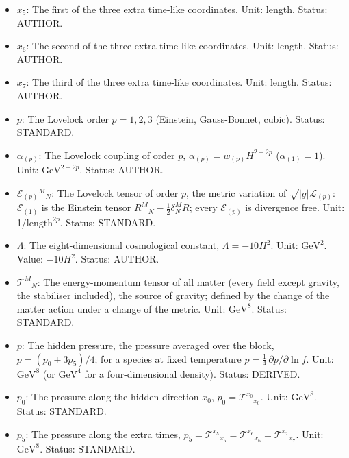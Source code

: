\documentclass[
  10pt,
]{article}
\begin{document}
\begin{itemize}
  depends on it through \(z = 6Hx_0\), periodically with the period
  \(\pi/(6H)\). Unit: length. Status: AUTHOR.
\item
  \(x_5\): The first of the three extra time-like coordinates. Unit:
  length. Status: AUTHOR.
\item
  \(x_6\): The second of the three extra time-like coordinates. Unit:
  length. Status: AUTHOR.
\item
  \(x_7\): The third of the three extra time-like coordinates. Unit:
  length. Status: AUTHOR.
\item
  \(p\): The Lovelock order \(p = 1, 2, 3\) (Einstein, Gauss-Bonnet,
  cubic). Status: STANDARD.
\item
  \(\alpha_{(p)}\): The Lovelock coupling of order \(p\),
  \(\alpha_{(p)} = w_{(p)}H^{2-2p}\) (\(\alpha_{(1)} = 1\)). Unit:
  \(\mathrm{GeV}^{2-2p}\). Status: AUTHOR.
\item
  \(\mathcal{E}_{(p)}{}^M{}_N\): The Lovelock tensor of order \(p\), the
  metric variation of \(\sqrt{\lvert g\rvert}\mathcal{L}_{(p)}\):
  \(\mathcal{E}_{(1)}\) is the Einstein tensor
  \(R^M{}_N - \frac12\delta^M_NR\); every \(\mathcal{E}_{(p)}\) is
  divergence free. Unit: 1/\(\mathrm{length}^{2p}\). Status: STANDARD.
\item
  \(\Lambda\): The eight-dimensional cosmological constant,
  \(\Lambda = -10H^2\). Unit: \(\mathrm{GeV}^{2}\). Value: \(-10H^2\).
  Status: AUTHOR.
\item
  \(\mathcal{T}^M{}_N\): The energy-momentum tensor of all matter (every
  field except gravity, the stabiliser included), the source of gravity;
  defined by the change of the matter action under a change of the
  metric. Unit: \(\mathrm{GeV}^{8}\). Status: STANDARD.
\item
  \(\bar p\): The hidden pressure, the pressure averaged over the block,
  \(\bar p = (p_0 + 3p_5)/4\); for a species at fixed temperature
  \(\bar p = \frac14\,\partial p/\partial\ln f\). Unit:
  \(\mathrm{GeV}^{8}\) (or \(\mathrm{GeV}^{4}\) for a four-dimensional
  density). Status: DERIVED.
\item
  \(p_0\): The pressure along the hidden direction \(x_0\),
  \(p_0 = \mathcal{T}^{x_0}{}_{x_0}\). Unit: \(\mathrm{GeV}^{8}\).
  Status: STANDARD.
\item
  \(p_5\): The pressure along the extra times,
  \(p_5 = \mathcal{T}^{x_5}{}_{x_5} = \mathcal{T}^{x_6}{}_{x_6} = \mathcal{T}^{x_7}{}_{x_7}\).
  Unit: \(\mathrm{GeV}^{8}\). Status: STANDARD.
\end{itemize}
\end{document}
